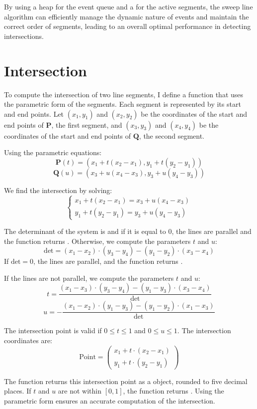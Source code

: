 \documentclass[10pt,a4paper,hidelinks]{article}
\begin{document}
By using a heap for the event queue and a  for the active segments, the sweep line algorithm can efficiently manage the dynamic nature of events and maintain the correct order of segments, leading to an overall optimal performance in detecting intersections.


\section{Intersection}
To compute the intersection of two line segments, I define a function  that uses the parametric form of the segments. Each segment is represented by its start and end points. Let $(x_1, y_1)$ and $(x_2, y_2)$ be the coordinates of the start and end points of $\mathbf{P}$, the first segment, and $(x_3, y_3)$ and $(x_4, y_4)$ be the coordinates of the start and end points of $\mathbf{Q}$, the second segment.

Using the parametric equations:
$$\mathbf{P}(t) = (x_1 + t(x_2 - x_1), y_1 + t(y_2 - y_1))$$
$$\mathbf{Q}(u) = (x_3 + u(x_4 - x_3), y_3 + u(y_4 - y_3))$$

We find the intersection by solving:
$$\left\{\begin{array}{l}
    x_1 + t(x_2 - x_1) = x_3 + u(x_4 - x_3)\\
    y_1 + t(y_2 - y_1) = y_3 + u(y_4 - y_3)
\end{array}\right.$$

The determinant of the system is and if it is equal to 0, the lines are parallel and the function returns . Otherwise, we compute the parameters $t$ and $u$:
$$\text{det} = (x_1 - x_2) \cdot (y_3 - y_4) - (y_1 - y_2) \cdot (x_3 - x_4)$$
If $\text{det} = 0$, the lines are parallel, and the function returns .

If the lines are not parallel, we compute the parameters $t$ and $u$:
$$t = \frac{(x_1 - x_3) \cdot (y_3 - y_4) - (y_1 - y_3) \cdot (x_3 - x_4)}{\text{det}}$$
$$u = -\frac{(x_1 - x_2) \cdot (y_1 - y_3) - (y_1 - y_2) \cdot (x_1 - x_3)}{\text{det}}$$

The intersection point is valid if $0 \leq t \leq 1$ and $0 \leq u \leq 1$. The intersection coordinates are:
$$
\text{Point} = 
\begin{pmatrix}
    x_1 + t \cdot (x_2 - x_1)\\
    y_1 + t \cdot (y_2 - y_1)
\end{pmatrix}
$$

The function returns this intersection point as a  object, rounded to five decimal places. If $t$ and $u$ are not within $[0, 1]$, the function returns . Using the parametric form ensures an accurate computation of the intersection.
\end{document}
